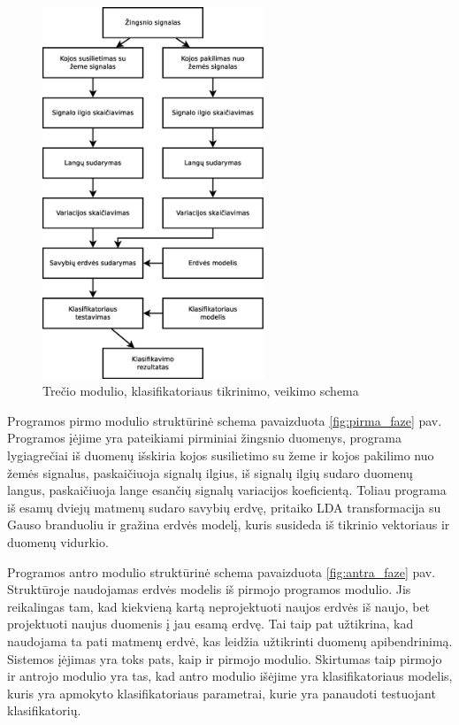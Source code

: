 \documentclass[]{vgtuef}
\begin{document}
\begin{figure}[!t]
  \centering
  \includegraphics[width=250px]{figures/trecia_faze.eps}
  \caption{Trečio modulio, klasifikatoriaus tikrinimo, veikimo schema}
  \label{fig:trecia_faze}
\end{figure}

Programos pirmo modulio struktūrinė schema pavaizduota \ref{fig:pirma_faze} pav. Programos įėjime yra pateikiami pirminiai žingsnio duomenys, programa lygiagrečiai iš duomenų išskiria kojos susilietimo su žeme ir kojos pakilimo nuo žemės signalus, paskaičiuoja signalų ilgius, iš signalų ilgių sudaro duomenų langus, paskaičiuoja lange esančių signalų variacijos koeficientą. Toliau programa iš esamų dviejų matmenų sudaro savybių erdvę, pritaiko LDA transformacija su Gauso branduoliu ir gražina erdvės modelį, kuris susideda iš tikrinio vektoriaus ir duomenų vidurkio.

Programos antro modulio struktūrinė schema pavaizduota \ref{fig:antra_faze} pav. Struktūroje naudojamas erdvės modelis iš pirmojo programos modulio. Jis reikalingas tam, kad kiekvieną kartą neprojektuoti naujos erdvės iš naujo, bet projektuoti naujus duomenis į jau esamą erdvę. Tai taip pat užtikrina, kad naudojama ta pati matmenų erdvė, kas leidžia užtikrinti duomenų apibendrinimą. Sistemos įėjimas yra toks pats, kaip ir pirmojo modulio. Skirtumas taip pirmojo ir antrojo modulio yra tas, kad antro modulio išėjime yra klasifikatoriaus modelis, kuris yra apmokyto klasifikatoriaus parametrai, kurie yra panaudoti testuojant klasifikatorių.
\end{document}
